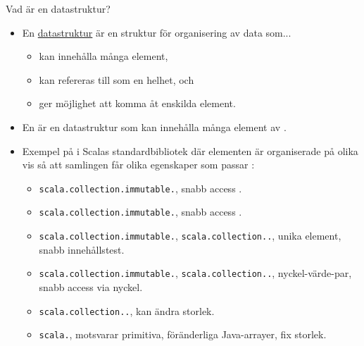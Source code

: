 
\ifkompendium\else

\begin{Slide}{Vad är en datastruktur?}\SlideFontSmall
\setlength{\leftmargini}{0pt}
\begin{itemize}
\item En \href{https://sv.wikipedia.org/wiki/Datastruktur}{datastruktur} är en struktur för organisering av data som...
\begin{itemize}\SlideFontTiny
\item kan innehålla många element,
\item kan refereras till som en helhet, och
\item ger möjlighet att komma åt enskilda element.
\end{itemize}

\item En   är en datastruktur som kan innehålla många element av .

\item Exempel på  i Scalas standardbibliotek där elementen är organiserade på olika vis så att samlingen får olika egenskaper som passar : 
\begin{itemize}\SlideFontTiny
\item \texttt{scala.collection.immutable.}, snabb access .
\item \texttt{scala.collection.immutable.}, snabb access .
\item \texttt{scala.collection.immutable.}, \texttt{scala.collection..}, unika element, snabb innehållstest.
\item \texttt{scala.collection.immutable.}, \texttt{scala.collection..}, nyckel-värde-par, snabb access via nyckel.
\item \texttt{scala.collection..}, kan ändra storlek.
\item \texttt{scala.}, motsvarar primitiva, föränderliga Java-arrayer, fix storlek.
\end{itemize}

\end{itemize}

\end{Slide} 

